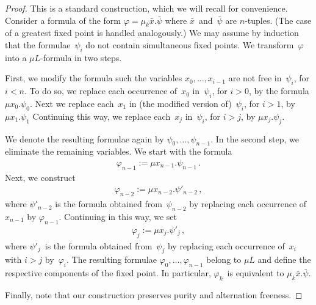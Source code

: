 \documentclass[10pt, fleqn]{scrartcl}
\newcommand*{\?}{\kern .08em}
\begin{document}
\begin{proof}
This is a standard construction, which we will recall for convenience.
Consider a formula of the form $\varphi = \mu_k\bar x.\bar\psi$ where $\bar x$~and~$\bar\psi$
are $n$-tuples. (The case of a greatest fixed point is handled analogously.)
We may assume by induction that the formulae~$\psi_i$ do not contain simultaneous fixed points.
We transform~$\varphi$ into a $\mu L$-formula in two steps.

First, we modify the formula such the variables $x_0,\dots,x_{i-1}$ are not free in~$\psi_i$,
for $i<n$. To do so, we replace each occurrence of~$x_0$ in~$\psi_i$, for $i > 0$, by
the formula $\mu x_0.\psi_0$.
Next we replace each~$x_1$ in (the modified version of)~$\psi_i$, for $i > 1$,
by $\mu x_1.\psi_1$
Continuing this way, we replace each~$x_j$ in~$\psi_i$, for $i > j$, by $\mu x_j.\psi_j$.

We denote the resulting formulae again by $\psi_0,\dots,\psi_{n-1}$.
In the second step, we eliminate the remaining variables. We start with the formula
\begin{align*}
  \varphi_{n-1} := \mu x_{n-1}.\psi_{n-1}\,.
\end{align*}
Next, we construct
\begin{align*}
  \varphi_{n-2} := \mu x_{n-2}.\psi'_{n-2}\,,
\end{align*}
where $\psi'_{n-2}$ is the formula obtained from~$\psi_{n-2}$ by replacing each
occurrence of~$x_{n-1}$ by $\varphi_{n-1}$.
Continuing in this way, we set
\begin{align*}
  \varphi_j := \mu x_j.\psi'_j\,,
\end{align*}
where $\psi'_j$~is the formula obtained from~$\psi_j$ by replacing each
occurrence of~$x_i$ with $i > j$ by~$\varphi_i$.
The resulting formulae $\varphi_0,\dots,\varphi_{n-1}$ belong to $\mu L$
and define the respective components of the fixed point.
In particular, $\varphi_k$~is equivalent to $\mu_k\bar x.\bar\psi$.

Finally, note that our construction preserves purity and alternation freeness.
\end{proof}
\end{document}
